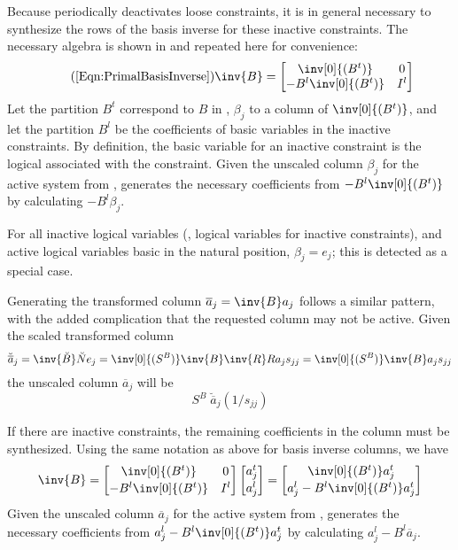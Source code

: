 Because \dylp periodically deactivates loose constraints, it is in general
necessary to synthesize the rows of the basis inverse for these
inactive constraints.
The necessary algebra is shown in  and repeated
here for convenience:
\begin{equation} \tag{\ref{Eqn:PrimalBasisInverse}}
\inv{B} = \begin{bmatrix}
	     \inv[0]{(B^t)} & 0 \\
	     -B^l\inv[0]{(B^t)} & I^l
	  \end{bmatrix}
\end{equation}
Let the partition $B^t$ correspond to $B$ in ,
$\beta_j$ to a column of $\inv[0]{(B^t)}$, and let the
partition $B^l$ be the coefficients of basic variables in the inactive
constraints.
By definition, the basic variable for an inactive constraint is the logical
associated with the constraint.
Given the unscaled column $\beta_j$ for the active system
from ,
\dylp generates the necessary
coefficients from $-B^l\inv[0]{(B^t)}$ by calculating $-B^l\beta_j$.

For all inactive logical variables (\ie, logical variables for inactive
constraints), and active logical variables basic in the natural position,
$\beta_j = e_j$; this is detected as a special case.

Generating the transformed column $\overline{a}_j = \inv{B}a_j$ follows a
similar pattern, with the added complication that the requested column
may not be active.
Given the scaled transformed column
\begin{equation*}
\breve{\overline{a}}_j = \inv{\breve{B}}\breve{N}e_j =
  \inv[0]{(S^B)}\inv{B}\inv{R} R a_j s_{jj} =
  \inv[0]{(S^B)}\inv{B}  a_j s_{jj}
\end{equation*}
the unscaled column $\overline{a}_j$ will be
\begin{equation} \label{eqn:unscaledAbarj}
S^B \; \breve{\overline{a}}_j (1/s_{jj})
\end{equation}

If there are inactive constraints, the remaining coefficients in the column
must be synthesized.
Using the same notation as above for basis inverse columns, we have
\begin{equation*}
\inv{B} = \begin{bmatrix}
	     \inv[0]{(B^t)} & 0 \\[.4ex]
	     -B^l\inv[0]{(B^t)} & I^l
	  \end{bmatrix}
	  \begin{bmatrix} a^t_j \\[.4ex] a^l_j \end{bmatrix}
        = \begin{bmatrix}
	     \inv[0]{(B^t)} a^t_j \\[.4ex]
	     a^l_j - B^l\inv[0]{(B^t)} a^t_j
	  \end{bmatrix}
\end{equation*}
Given the unscaled column $\overline{a}_j$ for the active system
from ,
\dylp generates the necessary
coefficients from $a^l_j - B^l\inv[0]{(B^t)} a^t_j$ by calculating
$a^l_j - B^l\overline{a}_j$.

